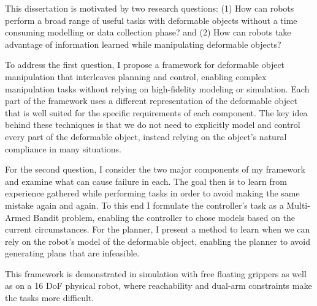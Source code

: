 This dissertation is motivated by two research questions: (1) How can robots perform a broad range of useful tasks with deformable objects without a time consuming modelling or data collection phase? and (2) How can robots take advantage of information learned while manipulating deformable objects?
        
To address the first question, I propose a framework for deformable object manipulation that interleaves planning and control, enabling complex manipulation tasks without relying on high-fidelity modeling or simulation. Each part of the framework uses a different representation of the deformable object that is well suited for the specific requirements of each component. The key idea behind these techniques is that we do not need to explicitly model and control every part of the deformable object, instead relying on the object's natural compliance in many situations. 

For the second question, I consider the two major components of my framework and examine what can cause failure in each. The goal then is to learn from experience gathered while performing tasks in order to avoid making the same mistake again and again. To this end I formulate the controller's task as a Multi-Armed Bandit problem, enabling the controller to chose models based on the current circumstances. For the planner, I present a method to learn when we can rely on the robot's model of the deformable object, enabling the planner to avoid generating plans that are infeasible.

This framework is demonstrated in simulation with free floating grippers as well as on a 16 DoF physical robot, where reachability and dual-arm constraints make the tasks more difficult.
